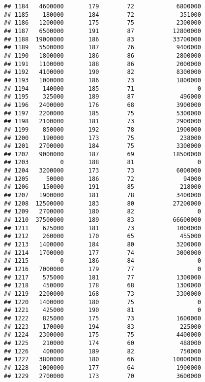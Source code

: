 \documentclass[
]{article}
\begin{document}
\begin{verbatim}
## 1184   4600000       179        72            6800000
## 1185    180000       184        72             351000
## 1186   1200000       175        75            2300000
## 1187   6500000       191        87           12800000
## 1188  19000000       186        83           33700000
## 1189   5500000       187        76            9400000
## 1190   1800000       186        86            2800000
## 1191   1100000       188        86            2000000
## 1192   4100000       190        82            8300000
## 1193   1000000       186        73            1800000
## 1194    140000       185        71                  0
## 1195    325000       189        87             496000
## 1196   2400000       176        68            3900000
## 1197   2200000       185        75            5300000
## 1198   2100000       181        73            2900000
## 1199    850000       192        78            1900000
## 1200    190000       173        75             238000
## 1201   2700000       184        75            3300000
## 1202   9000000       187        69           18500000
## 1203         0       188        81                  0
## 1204   3200000       173        73            6000000
## 1205     50000       186        72              94000
## 1206    150000       191        85             218000
## 1207   1900000       181        78            3400000
## 1208  12500000       183        80           27200000
## 1209   2700000       180        82                  0
## 1210  37500000       189        83           66600000
## 1211    625000       181        73            1000000
## 1212    260000       170        65             455000
## 1213   1400000       184        80            3200000
## 1214   1700000       177        74            3000000
## 1215         0       186        84                  0
## 1216   7000000       179        77                  0
## 1217    575000       181        77            1300000
## 1218    450000       178        68            1300000
## 1219   2200000       168        73            3300000
## 1220   1400000       180        75                  0
## 1221    425000       190        81                  0
## 1222    825000       175        73            1600000
## 1223    170000       194        83             225000
## 1224   2300000       175        75            4400000
## 1225    210000       174        60             488000
## 1226    400000       189        82             750000
## 1227   3800000       180        66           10000000
## 1228   1000000       177        64            1900000
## 1229   2700000       173        70            3600000

\end{verbatim}
\end{document}
